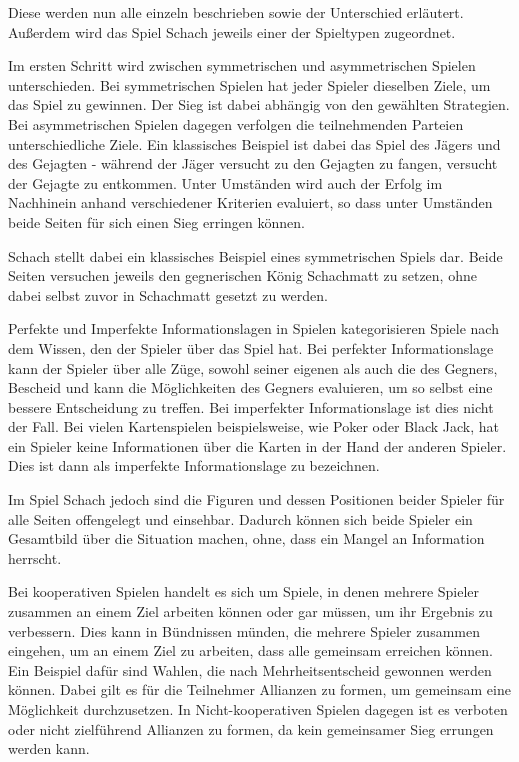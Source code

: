 Diese werden nun alle einzeln beschrieben sowie der Unterschied erläutert. Außerdem wird das Spiel Schach jeweils einer der Spieltypen zugeordnet.

Im ersten Schritt wird zwischen symmetrischen und asymmetrischen Spielen unterschieden. Bei symmetrischen Spielen hat jeder Spieler dieselben Ziele, um das Spiel zu gewinnen. Der Sieg ist dabei abhängig von den gewählten Strategien. Bei asymmetrischen Spielen dagegen verfolgen die teilnehmenden Parteien unterschiedliche Ziele. \cite{Rodriguez} Ein klassisches Beispiel ist dabei das Spiel des Jägers und des Gejagten - während der Jäger versucht zu den Gejagten zu fangen, versucht der Gejagte zu entkommen. Unter Umständen wird auch der Erfolg im Nachhinein anhand verschiedener Kriterien evaluiert, so dass unter Umständen beide Seiten für sich einen Sieg erringen können.

Schach stellt dabei ein klassisches Beispiel eines symmetrischen Spiels dar. Beide Seiten versuchen jeweils den gegnerischen König Schachmatt zu setzen, ohne dabei selbst zuvor in Schachmatt gesetzt zu werden.

Perfekte und Imperfekte Informationslagen in Spielen kategorisieren Spiele nach dem Wissen, den der Spieler über das Spiel hat. Bei perfekter Informationslage kann der Spieler über alle Züge, sowohl seiner eigenen als auch die des Gegners, Bescheid und kann die Möglichkeiten des Gegners evaluieren, um so selbst eine bessere Entscheidung zu treffen. Bei imperfekter Informationslage ist dies nicht der Fall. \cite{Rodriguez} Bei vielen Kartenspielen beispielsweise, wie Poker oder Black Jack, hat ein Spieler keine Informationen über die Karten in der Hand der anderen Spieler. Dies ist dann als imperfekte Informationslage zu bezeichnen.

Im Spiel Schach jedoch sind die Figuren und dessen Positionen beider Spieler für alle Seiten offengelegt und einsehbar. Dadurch können sich beide Spieler ein Gesamtbild über die Situation machen, ohne, dass ein Mangel an Information herrscht.

Bei kooperativen Spielen handelt es sich um Spiele, in denen mehrere Spieler zusammen an einem Ziel arbeiten können oder gar müssen, um ihr Ergebnis zu verbessern. Dies kann in Bündnissen münden, die mehrere Spieler zusammen eingehen, um an einem Ziel zu arbeiten, dass alle gemeinsam erreichen können. \cite{Rodriguez} Ein Beispiel dafür sind Wahlen, die nach Mehrheitsentscheid gewonnen werden können. Dabei gilt es für die Teilnehmer Allianzen zu formen, um gemeinsam eine Möglichkeit durchzusetzen. \cite{Apt} In Nicht-kooperativen Spielen dagegen ist es verboten oder nicht zielführend Allianzen zu formen, da kein gemeinsamer Sieg errungen werden kann. \cite{Rodriguez}

